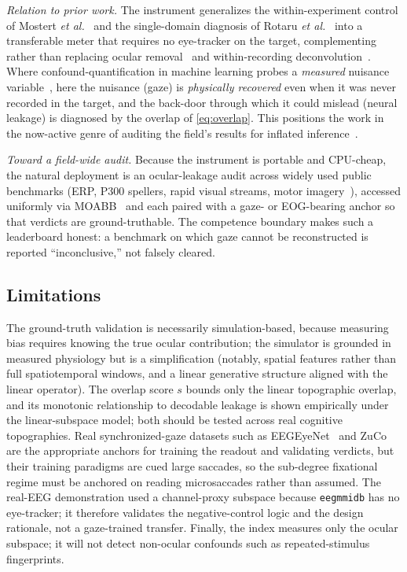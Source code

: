 \documentclass[conference]{IEEEtran}
\begin{document}
\emph{Relation to prior work.} The instrument generalizes the within-experiment control of
Mostert \emph{et al.}~\cite{mostert2018eye} and the single-domain diagnosis of Rotaru
\emph{et al.}~\cite{rotaru2024decoding} into a transferable meter that requires no eye-tracker
on the target, complementing rather than replacing ocular
removal~\cite{jung2000removing,dimigen2020optimizing} and within-recording
deconvolution~\cite{ehinger2019unfold}. Where confound-quantification in machine learning
probes a \emph{measured} nuisance variable~\cite{chaibubneto2018permutations}, here the nuisance
(gaze) is \emph{physically recovered} even when it was never recorded in the target, and the
back-door through which it could mislead (neural leakage) is diagnosed by the overlap of \eqref{eq:overlap}.
This positions the work in the now-active genre of auditing the field's results for inflated
inference~\cite{eklund2016cluster,kapoor2023leakage,brookshire2024leakage}.

\emph{Toward a field-wide audit.} Because the instrument is portable and CPU-cheap, the natural
deployment is an ocular-leakage audit across widely used public benchmarks (ERP, P300 spellers,
rapid visual streams, motor imagery~\cite{kappenman2021erpcore,polich2007p300,arico2014p300jitter,gifford2022thingseeg2}),
accessed uniformly via MOABB~\cite{jayaram2018moabb} and each paired with a gaze- or EOG-bearing
anchor so that verdicts are ground-truthable. The competence boundary makes
such a leaderboard honest: a benchmark on which gaze cannot be reconstructed is reported
``inconclusive,'' not falsely cleared.

\subsection{Limitations}

The ground-truth validation is necessarily simulation-based, because measuring bias requires
knowing the true ocular contribution; the simulator is grounded in measured physiology but is a
simplification (notably, spatial features rather than full spatiotemporal windows, and a linear
generative structure aligned with the linear operator). The overlap score $s$ bounds only the linear topographic overlap, and its monotonic relationship
to decodable leakage is shown empirically under the linear-subspace model; both should be tested
across real cognitive topographies. Real synchronized-gaze datasets
such as EEGEyeNet~\cite{kastrati2021eegeyenet} and ZuCo~\cite{hollenstein2018zuco,hollenstein2020zuco2}
are the appropriate anchors for training the readout and validating verdicts, but their training
paradigms are cued large saccades, so the sub-degree fixational regime must be anchored on
reading microsaccades rather than assumed. The real-EEG demonstration used a channel-proxy
subspace because \texttt{eegmmidb} has no eye-tracker; it therefore validates the negative-control
logic and the design rationale, not a gaze-trained transfer. Finally, the index measures only the
ocular subspace; it will not detect non-ocular confounds such as repeated-stimulus fingerprints.
\end{document}
